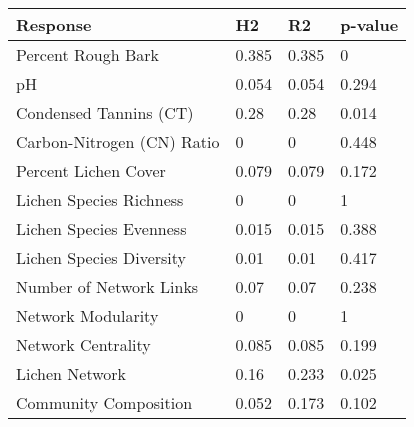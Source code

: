 \begin{table}[ht]
\centering
\begin{tabular}{llll}
  \hline
Response & H2 & R2 & p-value \\ 
  \hline
Percent Rough Bark & 0.385 & 0.385 & 0 \\ 
  pH & 0.054 & 0.054 & 0.294 \\ 
  Condensed Tannins (CT) & 0.28 & 0.28 & 0.014 \\ 
  Carbon-Nitrogen (CN) Ratio & 0 & 0 & 0.448 \\ 
  Percent Lichen Cover & 0.079 & 0.079 & 0.172 \\ 
  Lichen Species Richness & 0 & 0 & 1 \\ 
  Lichen Species Evenness & 0.015 & 0.015 & 0.388 \\ 
  Lichen Species Diversity & 0.01 & 0.01 & 0.417 \\ 
  Number of Network Links & 0.07 & 0.07 & 0.238 \\ 
  Network Modularity & 0 & 0 & 1 \\ 
  Network Centrality & 0.085 & 0.085 & 0.199 \\ 
  Lichen Network & 0.16 & 0.233 & 0.025 \\ 
  Community Composition & 0.052 & 0.173 & 0.102 \\ 
   \hline
\end{tabular}
\end{table}
